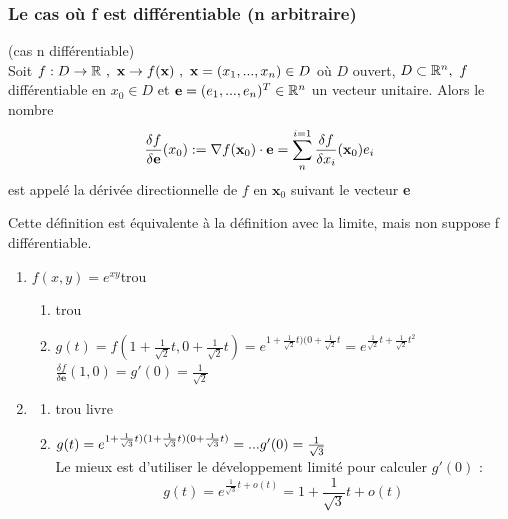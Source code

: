 \documentclass[12pt,a4paper]{article}
\begin{document}
\subsubsection{Le cas où f est différentiable (n arbitraire)}
\begin{boite}
	 (cas n différentiable)\\
	Soit $f : D \to \R \ , \ \textbf{x} \to f(\textbf{x}) \ , \ \textbf{x} = (x_1,...,x_n) \in D$ où $D$ ouvert, $D \subset \R^n,\ f$ différentiable en $x_0 \in D$ et $\textbf{e} = (e_1,...,e_n)^T \in \R^n$ un vecteur unitaire. Alors le nombre
	\begin{equation*}
		\frac{\delta f}{\delta \textbf{e}}(x_0) := \nabla f(\textbf{x}_0) \cdot \textbf{e} = \somme{i=1}{n}{\frac{\delta f}{\delta x_i}}(\textbf{x}_0) e_i
	\end{equation*}
	est appelé la dérivée directionnelle de $f$ en $\textbf{x}_0$ suivant le vecteur \textbf{e}
\end{boite}
 Cette définition est équivalente à la définition avec la limite, mais non suppose f différentiable.\\
\begin{enumerate}
	\item 	$f(x,y) = e^{xy}${trou}
			\begin{enumerate}
				\item {trou}
				\item 	$g(t) = f(1+\frac{1}{\sqrt{2}} t, 0+\frac{1}{\sqrt{2}} t) = e^{1+\frac{1}{\sqrt{2}} t)(0+\frac{1}{\sqrt{2}}t} = e^{\frac{1}{\sqrt{2}}t + \frac{1}{\sqrt{2}}t^2}$\\
				$\frac{\delta f}{\delta \textbf{e}}(1,0) = g'(0) = \frac{1}{\sqrt{2}}$
			\end{enumerate}
	\item	\begin{enumerate}
				\item 	{trou livre}
				\item 	$g(t) = e^{1+ \frac{1}{\sqrt{3}} t)( 1 + \frac{1}{\sqrt{3}} t)( 0 + \frac{1}{\sqrt{3}} t)} = ...\\
						g'(0) = \frac{1}{\sqrt{3}}$\\
						Le mieux est d'utiliser le développement limité pour calculer $g'(0)$ :
						\begin{equation*}
							g(t) = e^{\frac{1}{\sqrt{3}} t + o(t)} = 1 + \frac{1}{\sqrt{3}}t + o(t)
						\end{equation*}
			\end{enumerate}
\end{enumerate}
\end{document}
